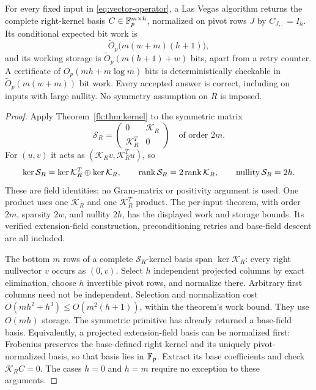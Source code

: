 \begin{theorem}\label{vec:thm:kernel}
For every fixed input in \eqref{eq:vector-operator}, a Las Vegas
algorithm returns the complete right-kernel basis
$C\in\mathbb F_p^{m\times h}$, normalized on pivot rows $J$ by $C_{J,:}=I_h$.
Its conditional expected bit work is
\[
 \widetilde O_p\bigl(m(w+m)(h+1)\bigr),
\]
and its working storage is
$\widetilde O_p(m(h+1)+w)$ bits, apart from a retry counter.
A certificate of $O_p(mh+m\log m)$ bits is deterministically
checkable in $\widetilde O_p(m(w+m))$ bit work.
Every accepted answer is correct, including on inputs with large
nullity. No symmetry assumption on $R$ is imposed.
\end{theorem}
\begin{proof}
Apply Theorem~\ref{fk:thm:kernel} to the symmetric matrix
\begin{equation}\label{eq:vector-doubling}
 \mathcal S_R=
 \begin{pmatrix}0&\mathcal K_R\\\mathcal K_R^T&0\end{pmatrix}
 \quad\text{of order }2m.
\end{equation}
For $(u,v)$ it acts as $(\mathcal K_Rv,\mathcal K_R^Tu)$, so
\[
 \ker\mathcal S_R=\ker\mathcal K_R^T\oplus\ker\mathcal K_R,
 \qquad \operatorname{rank}\mathcal S_R=2\operatorname{rank}\mathcal K_R,
 \qquad \operatorname{nullity}\mathcal S_R=2h.
\]
These are field identities; no Gram-matrix or positivity argument is
used. One product uses one $\mathcal K_R$ and one $\mathcal K_R^T$
product. The per-input theorem, with order $2m$, sparsity $2w$, and
nullity $2h$, has the displayed work and storage bounds. Its verified
extension-field construction, preconditioning retries and base-field
descent are all included.

The bottom $m$ rows of a complete $\mathcal S_R$-kernel basis span
$\ker\mathcal K_R$: every right nullvector $v$ occurs as $(0,v)$.
Select $h$ independent projected columns by exact elimination, choose
$h$ invertible pivot rows, and normalize there. Arbitrary first columns
need not be independent. Selection and normalization cost
$O(mh^2+h^3)\le O(m^2(h+1))$, within the theorem's work bound.
They use $O(mh)$ storage. The symmetric primitive has already returned
a base-field basis. Equivalently, a projected extension-field basis
can be normalized first: Frobenius preserves the base-defined right
kernel and its uniquely pivot-normalized basis, so that basis lies in
$\mathbb F_p$. Extract its base coefficients and check $\mathcal K_RC=0$.
The cases $h=0$ and $h=m$ require no exception to these arguments.


\end{proof}
